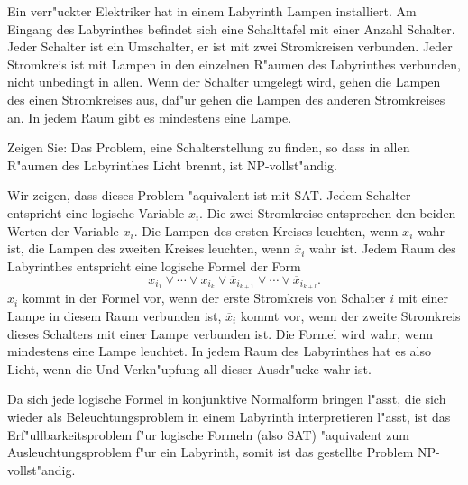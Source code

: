 Ein verr"uckter Elektriker hat in einem Labyrinth Lampen installiert.
Am Eingang des Labyrinthes befindet sich eine Schalttafel mit einer
Anzahl Schalter. Jeder Schalter ist ein Umschalter, er ist mit
zwei Stromkreisen verbunden. Jeder Stromkreis ist mit Lampen in
den einzelnen R"aumen des Labyrinthes verbunden, nicht unbedingt in
allen.
Wenn der
Schalter umgelegt wird, gehen die Lampen des einen
Stromkreises aus, daf"ur gehen die Lampen des anderen Stromkreises an.
In jedem Raum gibt es mindestens eine Lampe.

Zeigen Sie: Das Problem, eine Schalterstellung zu finden, so
dass in allen R"aumen des Labyrinthes Licht brennt, ist NP-vollst"andig.

\begin{loesung}
Wir zeigen, dass dieses Problem "aquivalent ist mit SAT. Jedem Schalter
entspricht eine logische Variable $x_i$. Die zwei Stromkreise entsprechen
den beiden Werten der Variable $x_i$. Die Lampen des ersten Kreises leuchten,
wenn $x_i$ wahr ist, die Lampen des zweiten Kreises leuchten, wenn
$\overline x_i$ wahr ist.
Jedem Raum des Labyrinthes entspricht eine logische Formel der Form
\[
x_{i_1}\vee \cdots \vee x_{i_k}\vee \overline x_{i_{k+1}}\vee \cdots\vee \overline x_{i_{k+l}}.
\]
$x_i$ kommt in der Formel vor, wenn der erste Stromkreis von Schalter $i$
mit einer Lampe in diesem Raum verbunden ist, $\overline x_i$ kommt vor,
wenn der zweite Stromkreis dieses Schalters mit einer Lampe verbunden ist.
Die Formel wird wahr, wenn mindestens eine Lampe leuchtet. In jedem Raum
des Labyrinthes hat es also Licht, wenn die Und-Verkn"upfung all dieser
Ausdr"ucke wahr ist.

Da sich jede logische Formel in konjunktive Normalform bringen l"asst,
die sich wieder als Beleuchtungsproblem in einem Labyrinth interpretieren
l"asst, ist das Erf"ullbarkeitsproblem f"ur logische Formeln (also SAT)
"aquivalent zum Ausleuchtungsproblem f"ur ein Labyrinth, somit ist
das gestellte Problem NP-vollst"andig.
\end{loesung}
